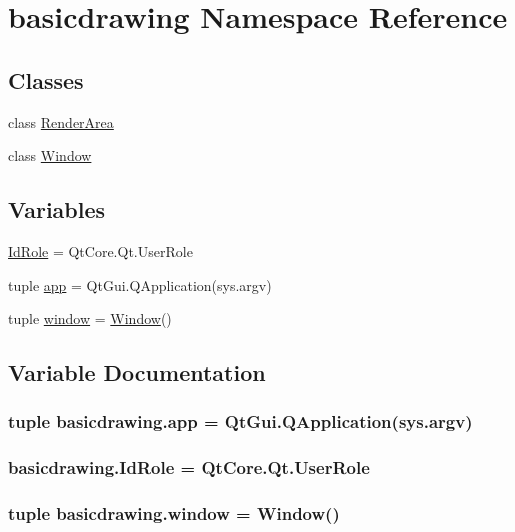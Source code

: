 \hypertarget{namespacebasicdrawing}{}\section{basicdrawing Namespace Reference}
\label{namespacebasicdrawing}
\subsection*{Classes}
\begin{DoxyCompactItemize}
\item 
class \hyperlink{classbasicdrawing_1_1RenderArea}{Render\+Area}
\item 
class \hyperlink{classbasicdrawing_1_1Window}{Window}
\end{DoxyCompactItemize}
\subsection*{Variables}
\begin{DoxyCompactItemize}
\item 
\hyperlink{namespacebasicdrawing_a48102a696cfe1e2c4b8279b2a67ceb9d}{Id\+Role} = Qt\+Core.\+Qt.\+User\+Role
\item 
tuple \hyperlink{namespacebasicdrawing_a02ed3a6286174f185a57486a3b51aa1f}{app} = Qt\+Gui.\+Q\+Application(sys.\+argv)
\item 
tuple \hyperlink{namespacebasicdrawing_a8848011308a3fcb3ad2b399835bb3eb0}{window} = \hyperlink{classbasicdrawing_1_1Window}{Window}()
\end{DoxyCompactItemize}


\subsection{Variable Documentation}
\hypertarget{namespacebasicdrawing_a02ed3a6286174f185a57486a3b51aa1f}{}
\subsubsection[{app}]{\setlength{\rightskip}{0pt plus 5cm}tuple basicdrawing.\+app = Qt\+Gui.\+Q\+Application(sys.\+argv)}\label{namespacebasicdrawing_a02ed3a6286174f185a57486a3b51aa1f}
\hypertarget{namespacebasicdrawing_a48102a696cfe1e2c4b8279b2a67ceb9d}{}
\subsubsection[{Id\+Role}]{\setlength{\rightskip}{0pt plus 5cm}basicdrawing.\+Id\+Role = Qt\+Core.\+Qt.\+User\+Role}\label{namespacebasicdrawing_a48102a696cfe1e2c4b8279b2a67ceb9d}
\hypertarget{namespacebasicdrawing_a8848011308a3fcb3ad2b399835bb3eb0}{}
\subsubsection[{window}]{\setlength{\rightskip}{0pt plus 5cm}tuple basicdrawing.\+window = {\bf Window}()}\label{namespacebasicdrawing_a8848011308a3fcb3ad2b399835bb3eb0}

